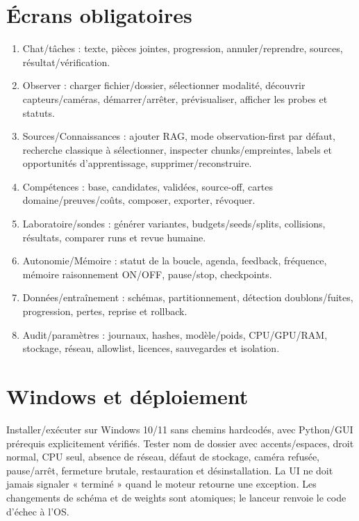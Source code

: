 \documentclass[11pt,a4paper,oneside]{report}
\begin{document}
\section{Écrans obligatoires}
\begin{enumerate}
\item Chat/tâches : texte, pièces jointes, progression, annuler/reprendre, sources, résultat/vérification.
\item Observer : charger fichier/dossier, sélectionner modalité, découvrir capteurs/caméras, démarrer/arrêter, prévisualiser, afficher les probes et statuts.
\item Sources/Connaissances : ajouter RAG, mode observation-first par défaut, recherche classique à sélectionner, inspecter chunks/empreintes, labels et opportunités d'apprentissage, supprimer/reconstruire.
\item Compétences : base, candidates, validées, source-off, cartes domaine/preuves/coûts, composer, exporter, révoquer.
\item Laboratoire/sondes : générer variantes, budgets/seeds/splits, collisions, résultats, comparer runs et revue humaine.
\item Autonomie/Mémoire : statut de la boucle, agenda, feedback, fréquence, mémoire raisonnement ON/OFF, pause/stop, checkpoints.
\item Données/entraînement : schémas, partitionnement, détection doublons/fuites, progression, pertes, reprise et rollback.
\item Audit/paramètres : journaux, hashes, modèle/poids, CPU/GPU/RAM, stockage, réseau, allowlist, licences, sauvegardes et isolation.
\end{enumerate}

\section{Windows et déploiement}
Installer/exécuter sur Windows 10/11 sans chemins hardcodés, avec Python/GUI prérequis explicitement vérifiés. Tester nom de dossier avec accents/espaces, droit normal, CPU seul, absence de réseau, défaut de stockage, caméra refusée, pause/arrêt, fermeture brutale, restauration et désinstallation. La UI ne doit jamais signaler « terminé » quand le moteur retourne une exception. Les changements de schéma et de weights sont atomiques; le lanceur renvoie le code d'échec à l'OS.
\end{document}
